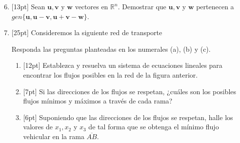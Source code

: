 \documentclass[11pt]{article}
\begin{document}
\begin{enumerate}
\setcounter{enumi}{5}
\item{}[13pt] Sean $\mathbf{u}, \mathbf{v}$ y $\mathbf{w}$ vectores en $\mathbb{R}^n$. Demostrar que $\mathbf{u}, \mathbf{v}$ y $\mathbf{w}$ pertenecen a $gen\{\mathbf{u}, \mathbf{u}-\mathbf{v}, \mathbf{u}+\mathbf{v}-\mathbf{w}\}$.

\vspace{6cm}

\item{}[25pt] Consideremos la siguiente red de transporte

\vspace{6pt}
\begin{center}
\end{center}

\noindent Responda las preguntas planteadas en los numerales (a), (b) y (c).

\begin{enumerate}
\item{}[12pt] Establezca y resuelva un sistema de ecuaciones lineales para encontrar los flujos posibles en la red de la figura anterior.

\vspace{5cm}

\item{}[7pt] Si las direcciones de los flujos se respetan, ¿cuáles son los posibles flujos mínimos y máximos a través de cada rama?

\vspace{4cm}

\item{}[6pt] Suponiendo que las direcciones de los flujos se respetan, halle los valores de $x_1, x_2$ y $x_3$ de tal forma que se obtenga el mínimo flujo vehicular en la rama $\overline{AB}$.
\end{enumerate}


\end{enumerate}
\end{document}
